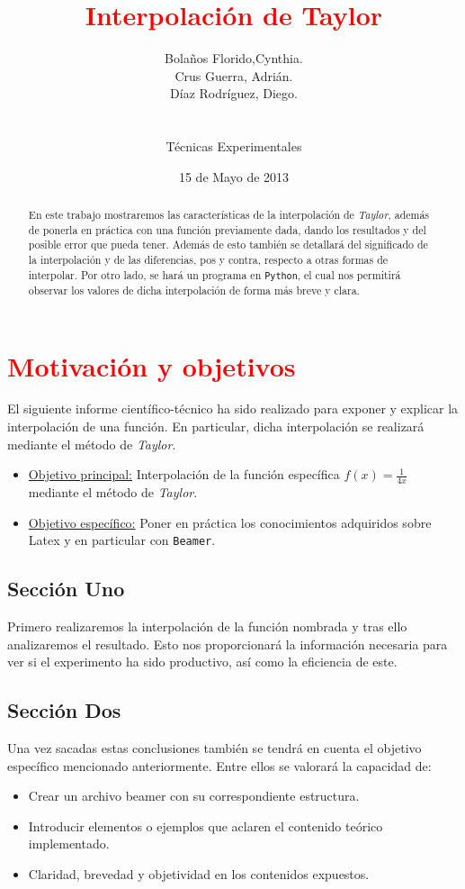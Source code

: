 \documentclass[a4paper,12pt]{article}
\begin{document}
\pagecolor[gray]{0.9}

\title {\textcolor{red}{Interpolación de Taylor}}
\author{Bolaños Florido,Cynthia. \\
Crus Guerra, Adrián.\\
Díaz Rodríguez, Diego.\\ 
\\
\\Técnicas Experimentales}
\date{15 de Mayo de 2013}
\maketitle
 \newpage
\begin{abstract}
 En este trabajo mostraremos las características de la interpolación de {\em Taylor}, 
 además de ponerla en práctica con una función previamente dada, dando los resultados y del posible error que pueda tener.
 Además de esto también se detallará del significado de la interpolación y de las diferencias, pos y contra, 
 respecto a otras formas de interpolar. 
 Por otro lado, se hará un programa en {\tt Python}, el cual nos permitirá observar los valores de dicha interpolación de forma más breve y clara.
 \end{abstract}
  \newpage
\tableofcontents
  \newpage
 \section{\textcolor{red}{Motivación y objetivos}}
 El siguiente informe científico-técnico ha sido realizado para exponer y explicar la interpolación de una función. En particular,
 dicha interpolación se realizará mediante el método de {\em Taylor}.
 \begin{itemize}
  \item \underline{Objetivo principal:} Interpolación  de la función específica $f(x)=\frac{1}{4x}$ mediante el método de {\em Taylor}.
  \item  \underline{Objetivo específico:} Poner en práctica los conocimientos adquiridos sobre Latex y en particular con {\tt Beamer}.
 \end{itemize}
\subsection{Sección Uno}
Primero realizaremos la interpolación de la función nombrada y tras ello analizaremos el resultado.
Esto nos proporcionará la información necesaria para ver si el experimento ha sido productivo, así como la eficiencia de este.
\subsection{Sección Dos}
Una vez sacadas estas conclusiones también se tendrá en cuenta el objetivo específico mencionado anteriormente. 
Entre ellos se valorará la capacidad de:
 \begin{itemize}
  \item   Crear un archivo beamer con su correspondiente estructura.
  \item   Introducir elementos o ejemplos que aclaren el contenido teórico implementado.
  \item   Claridad, brevedad y objetividad en los contenidos expuestos.
 \end{itemize}
\newpage
\end{document}
